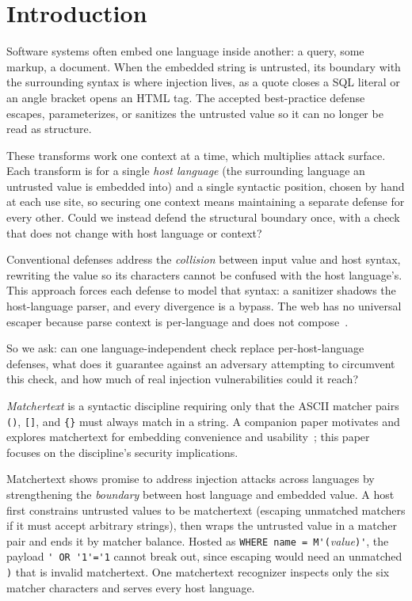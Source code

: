 \section{Introduction}
\label{sec:intro}

Software systems often embed one language inside another: a query, some markup,
a document. When the embedded string is untrusted, its boundary with the
surrounding syntax is where injection lives, as a quote closes a SQL literal or an
angle bracket opens an HTML tag.
The accepted best-practice defense escapes, parameterizes, or
sanitizes the untrusted value so it can no longer be read as structure.

These transforms work one context at a time,
which multiplies attack surface.
Each transform is for a single \emph{host language}
(the surrounding language an untrusted value is embedded into)
and a single syntactic position, chosen by hand at each use site,
so securing one context means maintaining a separate defense for every other.
Could we instead defend the structural boundary once,
with a check that does not change with host language or context?

Conventional defenses address the \emph{collision}
between input value and host syntax,
rewriting the value so its characters cannot be confused with
the host language's.
This approach forces each defense to model that syntax: a sanitizer
shadows the host-language parser, and every divergence is a bypass.
The web has no
universal escaper because parse context is per-language and does not
compose~\cite{owasp_xss}.

So we ask:
can one language-independent check replace per-host-language defenses,
what does it guarantee against an adversary
attempting to circumvent this check,
and how much of real injection vulnerabilities could it reach?

\emph{Matchertext} is a syntactic discipline
requiring only that the ASCII matcher pairs \verb|()|,
\verb|[]|, and \verb|{}| must always match in a string.
A companion paper motivates and explores matchertext
for embedding convenience and usability~\cite{matchertext};
this paper focuses on the discipline's security implications.

Matchertext shows promise to address injection attacks across languages
by strengthening the \emph{boundary}
between host language and embedded value.
A host first constrains untrusted values to be matchertext
(escaping unmatched matchers if it must accept arbitrary strings),
then wraps the untrusted value in a matcher pair
and ends it by matcher balance.
Hosted as \verb|WHERE name = M'(|\emph{value}\verb|)'|,
the payload \verb|' OR '1'='1| cannot break out,
since escaping would need an unmatched \verb|)| that is invalid
matchertext.
One matchertext recognizer inspects only the six matcher characters and serves
every host language.

